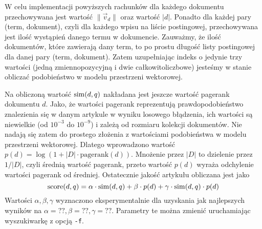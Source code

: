 \documentclass[a4paper,12pt]{article}
\begin{document}
W celu implementacji powyższych rachunków dla każdego dokumentu przechowywana
jest wartość $\|\vec v_d\|$ oraz wartość $|d|$. Ponadto dla każdej pary
(term, dokument), czyli dla każdego wpisu na liście postingowej, przechowywana
jest ilość wystąpień danego termu w dokumencie. Zauważmy, że ilość dokumentów,
które zawierają dany term, to po prostu długość listy postingowej dla danej pary
(term, dokument). Zatem uzupełniając indeks o jedynie trzy wartości (jedną
zmiennopozycyjną i dwie całkowitoliczbowe) jesteśmy w stanie obliczać
podobieństwo w modelu przestrzeni wektorowej.

Na obliczoną wartość $\mathrm{sim}(d,q)$ nakładana jest jeszcze wartość pagerank
dokumentu $d$. Jako, że wartości pagerank reprezentują prawdopodobieństwo
znalezienia się w danym artykule w wyniku losowego błądzenia, ich wartości 
są niewielkie (od $10^{-3}$ do $10^{-9}$) i zależą od rozmiaru kolekcji
dokumentów. Nie nadają się zatem do prostego złożenia z wartościami podobieństwa
w modelu przestrzeni wektorowej. Dlatego wprowadzono wartość $p(d) = \log (1+|D| \cdot \mathrm{pagerank}(d))$.
Mnożenie przez $|D|$ to dzielenie przez $1/|D|$, czyli średnią wartość pagerank,
przeto wartość $p(d)$ wyraża odchylenie wartości pagerank od średniej.
Ostatecznie jakość artykułu obliczana jest jako
\[ \mathrm{score}(d,q) = \alpha \cdot \mathrm{sim}(d,q) +
                         \beta \cdot p(d) +
                         \gamma \cdot \mathrm{sim}(d,q) \cdot p(d) \]
Wartości $\alpha, \beta, \gamma$ wyznaczono eksperymentalnie dla uzyskania
jak najlepszych wyników na $\alpha = ??, \beta = ??, \gamma = ??$. Parametry
te można zmienić uruchamiając wyszukiwarkę z opcją \texttt{-f}.
\end{document}
